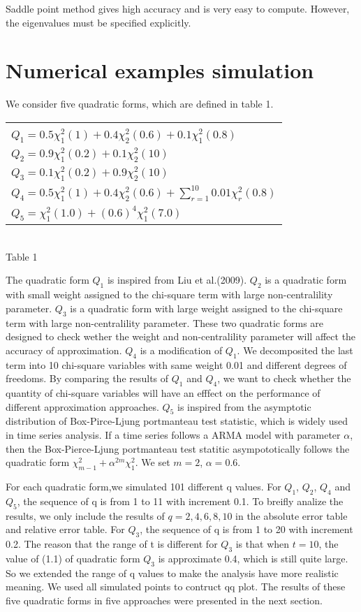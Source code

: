 \documentclass[paper=a4]{article}
\numberwithin{equation}{section}
\begin{document}
Saddle point method gives high accuracy and is very easy to compute. However, the eigenvalues must be specified explicitly.

\section{Numerical examples simulation}

We consider five quadratic forms, which are defined in table 1.
	\begin{center}	
	\begin{tabular}{l}\hline\\
		$Q_1= 0.5\chi_1^2(1)+0.4\chi_2^2(0.6)+0.1\chi_1^2(0.8)$\\
		$Q_2= 0.9\chi_1^2(0.2)+0.1\chi_2^2(10)	$	\\
		$Q_3= 0.1\chi_1^2(0.2)+0.9\chi_2^2(10)	$	\\
		$Q_4= 0.5\chi_1^2(1)+0.4\chi_2^2(0.6)+\sum_{r=1}^{10}0.01\chi_r^2(0.8)$		\\
		$Q_5=\chi_1^2(1.0)+(0.6)^4\chi_1^2(7.0)$\\
        \hline	
		\end{tabular}
	\\
	Table 1
	\end{center}
	
The quadratic form $Q_1$ is inspired from Liu et al.(2009). $Q_2$ is a quadratic form with small weight assigned to the chi-square term with large non-centralility parameter. $Q_3$ is a quadratic form with large weight assigned to the chi-square term with large non-centralility parameter. These two quadratic forms are designed to check wether the weight and non-centralility parameter will affect the accuracy of approximation. $Q_4$ is a modification of $Q_1$. We decomposited the last term into 10 chi-square variables with same weight 0.01 and different degrees of freedoms. By comparing the results of $Q_1$ and $Q_4$, we want to check whether the quantity of chi-square variables will have an efffect on the performance of different approximation approaches. $Q_5$ is inspired from the asymptotic distribution of Box-Pirce-Ljung portmanteau test statistic, which is widely used in time series analysis. If a time series follows a ARMA model with parameter $\alpha$, then the Box-Pierce-Ljung portmanteau test statitic asympototically follows the quadratic form $\chi_{m-1}^2+\alpha^{2m}\chi_1^2$. We set $m=2$, $\alpha=0.6$.

For each quadratic form,we simulated 101 different q values. For $Q_1$, $Q_2$, $Q_4$ and $Q_5$, the sequence of q is from 1 to 11 with increment 0.1. To breifly analize the results, we only include the results of  $q=2,4,6,8,10$ in the absolute error table and relative error table. For $Q_3$, the sequence of q is from 1 to 20 with increment 0.2. The reason that the range of t is different for $Q_3$ is that when $t=10$, the value of (1.1) of quadratic form $Q_3$ is approximate 0.4, which is still quite large. So we extended the range of q values to make the analysis have more realistic meaning. We used  all simulated points to contruct qq plot. The results of these five quadratic forms in five approaches were presented in the next section.
\end{document}
